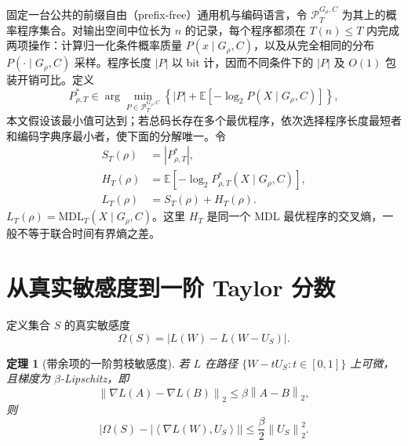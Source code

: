 \documentclass[conference,a4paper]{IEEEtran}
\newtheorem{theorem}{定理}
\newcommand{\E}{\mathbb{E}}
\newcommand{\inner}[2]{\left\langle #1,#2\right\rangle}
\newcommand{\norm}[1]{\left\lVert #1\right\rVert}
\newcommand{\MDL}{\mathrm{MDL}}
\begin{document}
固定一台公共的前缀自由（prefix-free）通用机与编码语言，令 $\mathcal P_T^{G_\rho,C}$ 为其上的概率程序集合。对输出空间中位长为 $n$ 的记录，每个程序都须在 $T(n)\leq T$ 内完成两项操作：计算归一化条件概率质量 $P(x\mid G_\rho,C)$，以及从完全相同的分布 $P(\cdot\mid G_\rho,C)$ 采样。程序长度 $|P|$ 以 bit 计，因而不同条件下的 $|P|$ 及 $O(1)$ 包装开销可比。定义
\begin{equation}
P_{\rho,T}^{*}\in\arg\min_{P\in\mathcal P_T^{G_\rho,C}}
\left\{|P|+\E[-\log_2P(X\mid G_\rho,C)]\right\},
\label{eq:condmdl}
\end{equation}
本文假设该最小值可达到；若总码长存在多个最优程序，依次选择程序长度最短者和编码字典序最小者，使下面的分解唯一。令
\begin{align}
S_T(\rho)&=|P_{\rho,T}^{*}|,\\
H_T(\rho)&=\E[-\log_2P_{\rho,T}^{*}(X\mid G_\rho,C)],\\
L_T(\rho)&=S_T(\rho)+H_T(\rho).
\label{eq:shl}
\end{align}
$L_T(\rho)=\MDL_T(X\mid G_\rho,C)$。这里 $H_T$ 是同一个 MDL 最优程序的交叉熵，一般不等于联合时间有界熵之差\cite{finzi2026epiplexity}。

\section{从真实敏感度到一阶 Taylor 分数}

定义集合 $S$ 的真实敏感度
\begin{equation}
\Omega(S)=|L(W)-L(W-U_S)|.
\label{eq:trueomega}
\end{equation}

\begin{theorem}[带余项的一阶剪枝敏感度]
若 $L$ 在路径 $\{W-tU_S:t\in[0,1]\}$ 上可微，且梯度为 $\beta$-Lipschitz，即
\begin{equation}
\norm{\nabla L(A)-\nabla L(B)}_2\leq\beta\norm{A-B}_2,
\end{equation}
则
\begin{equation}
\left|\Omega(S)-\left|\inner{\nabla L(W)}{U_S}\right|\right|
\leq\frac{\beta}{2}\norm{U_S}_2^2.
\label{eq:taylorbound}
\end{equation}
\end{theorem}
\end{document}
